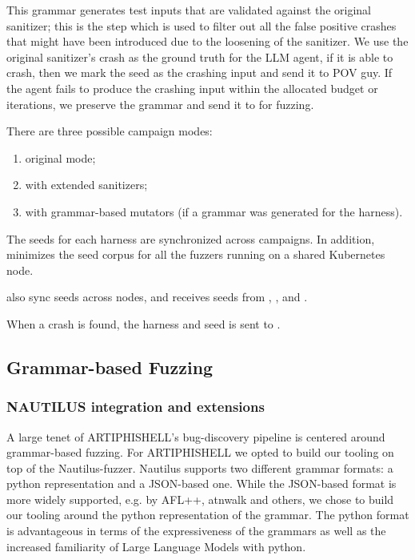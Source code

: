 This grammar generates test inputs that are validated against the original sanitizer; this is the step which is used to filter out all the false positive crashes that might have been introduced due to the loosening of the sanitizer. We use the original sanitizer's crash as the ground truth for the LLM agent, if it is able to crash, then we mark the seed as the crashing input and send it to POV guy. If the agent fails to produce the crashing input within the allocated budget or iterations, we preserve the grammar and send it to \revolver for fuzzing.

There are three possible campaign modes:

\begin{enumerate}
\item original mode;
\item with extended sanitizers;
\item with grammar-based mutators (if a grammar was generated for the harness).
\end{enumerate}

The seeds for each harness are synchronized across campaigns.
In addition, \jazzmine minimizes the seed corpus for all the fuzzers running on a shared Kubernetes node.

\jazzmine also sync seeds across nodes, and receives seeds from \grammarguy, \quickseed, and \discoveryguy.

When a crash is found, the harness and seed is sent to \povguy.

\subsection{Grammar-based Fuzzing}

\subsubsection{NAUTILUS integration and extensions}

A large tenet of ARTIPHISHELL's bug-discovery pipeline is centered around grammar-based fuzzing. For ARTIPHISHELL we opted to build our tooling on top of the Nautilus-fuzzer. Nautilus supports two different grammar formats: a python representation and a JSON-based one. While the JSON-based format is more widely supported, e.g. by AFL++, atnwalk and others, we chose to build our tooling around the python representation of the grammar. The python format is advantageous in terms of the expressiveness of the grammars as well as the increased familiarity of Large Language Models with python.

